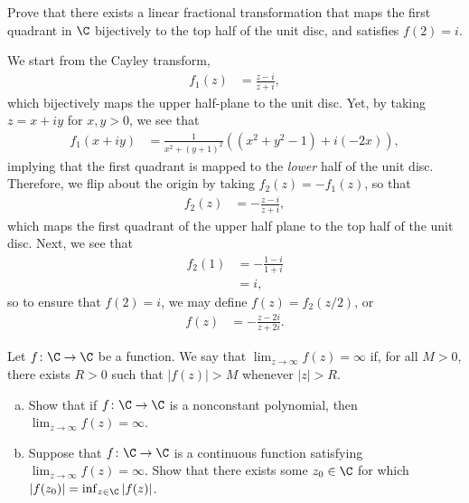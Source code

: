 \documentclass[10pt]{mypackage}
\begin{document}
\begin{problem}[Problem 3]
  Prove that there exists a linear fractional transformation that maps the first quadrant in $\C$ bijectively to the top half of the unit disc, and satisfies $f(2) = i$.
\end{problem}
\begin{solution}
  We start from the Cayley transform,
  \begin{align*}
    f_1(z) &= \frac{z-i}{z+i},
  \end{align*}
  which bijectively maps the upper half-plane to the unit disc. Yet, by taking $z = x + iy$ for $ x,y > 0$, we see that
  \begin{align*}
    f_1\left( x+iy \right) &= \frac{1}{x^2 + \left( y+1 \right)^2}\left( \left( x^2 + y^2 - 1 \right) + i\left( -2x \right) \right),
  \end{align*}
  implying that the first quadrant is mapped to the \textit{lower} half of the unit disc. Therefore, we flip about the origin by taking $f_2(z) = -f_1(z)$, so that
  \begin{align*}
    f_2(z) &= -\frac{z-i}{z+i},
  \end{align*}
  which maps the first quadrant of the upper half plane to the top half of the unit disc. Next, we see that
  \begin{align*}
    f_2(1) &= -\frac{1-i}{1+i}\\
           &= i,
  \end{align*}
  so to ensure that $f(2) = i$, we may define $f(z) = f_2(z/2)$, or
  \begin{align*}
    f(z) &= -\frac{z-2i}{z+2i}.
  \end{align*}
\end{solution}
\begin{problem}[Problem 4]
  Let $f\colon \C\rightarrow \C$ be a function. We say that $\lim_{z\rightarrow\infty}f(z) = \infty$ if, for all $M > 0$, there exists $R > 0$ such that $\left\vert f(z)  \right\vert > M$ whenever $\left\vert z \right\vert > R$.
  \begin{enumerate}[(a)]
    \item Show that if $f\colon \C\rightarrow \C$ is a nonconstant polynomial, then $\lim_{z\rightarrow\infty}f(z) = \infty$.
    \item Suppose that $f\colon \C\rightarrow \C$ is a continuous function satisfying $\lim_{z\rightarrow\infty}f(z) = \infty$. Show that there exists some $z_0\in \C$ for which $\left\vert f(z_0) \right\vert = \inf_{z\in \C} \left\vert f(z) \right\vert$.
  \end{enumerate}
\end{problem}
\end{document}
